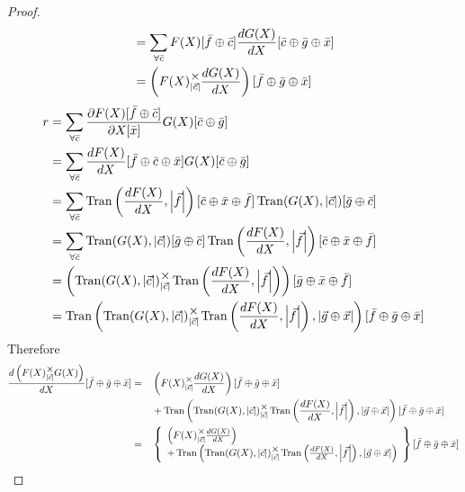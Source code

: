 \documentclass[12pt]{book}
\theoremstyle{plain}
\theoremstyle{definition}
\theoremstyle{ppart}
\theoremstyle{case}
\theoremstyle{solution}
\DeclareMathOperator{\Tran}{Tran}
\newcommand{\mmult}[1]{\text{\raisebox{1ex}{$\underset{#1}{\times}$}}}
\newcommand{\shape}[1]{\left|#1\right|}
\begin{document}
\begin{landscape}
\begin{proof}
\begin{align*}
 &=
  \sum_{\forall \bar{c}}
    F(X)[\bar{f} \oplus \bar{c}]
    \frac{dG(X)}{dX}[\bar{c} \oplus \bar{g} \oplus \bar{x}] \\
 &=
   \left( F(X) \mmult{\shape{\vec{c}}} \frac{dG(X)}{dX} \right)
   [\bar{f} \oplus \bar{g} \oplus \bar{x}]
\end{align*}
\begin{align*}
 r
 &=
  \sum_{\forall \bar{c}}
    \frac{\partial F(X)[\bar{f} \oplus \bar{c}]}{\partial X[\bar{x}]}
    G(X)[\bar{c} \oplus \bar{g}] \\
 &=
  \sum_{\forall \bar{c}}
    \frac{dF(X)}{dX}[\bar{f} \oplus \bar{c} \oplus \bar{x}]
    G(X)[\bar{c} \oplus \bar{g}] \\
 &=
  \sum_{\forall \bar{c}}
    \Tran\left(\frac{dF(X)}{dX}, \shape{\vec{f}}\right)
      [\bar{c} \oplus \bar{x} \oplus \bar{f}]
    \Tran(G(X), \shape{\vec{c}})[\bar{g} \oplus \bar{c}] \\
 &=
  \sum_{\forall \bar{c}}
    \Tran(G(X), \shape{\vec{c}})[\bar{g} \oplus \bar{c}]
    \Tran\left(\frac{dF(X)}{dX}, \shape{\vec{f}}\right)
      [\bar{c} \oplus \bar{x} \oplus \bar{f}] \\
 &=
  \left(
    \Tran(G(X), \shape{\vec{c}}) \mmult{\shape{\vec{c}}}
    \Tran\left(\frac{dF(X)}{dX}, \shape{\vec{f}}\right)
  \right)[\bar{g} \oplus \bar{x} \oplus \bar{f}] \\
 &= 
  \Tran\left(
    \Tran(G(X), \shape{\vec{c}}) \mmult{\shape{\vec{c}}}
    \Tran\left(\frac{dF(X)}{dX}, \shape{\vec{f}}\right)
    , \shape{\vec{g} \oplus \vec{x}}
  \right)[\bar{f} \oplus \bar{g} \oplus \bar{x}]
\end{align*}
Therefore 
\begin{alignat*}{3}
 \frac{d\left(F(X) \mmult{\shape{\vec{c}}} G(X)\right)}{dX}
  [\bar{f} \oplus \bar{g} \oplus \bar{x}]
  &=&&
  \left( F(X) \mmult{\shape{\vec{c}}} \frac{dG(X)}{dX} \right)
  [\bar{f} \oplus \bar{g} \oplus \bar{x}] \\
  &&&+
  \Tran\left(
    \Tran(G(X), \shape{\vec{c}}) \mmult{\shape{\vec{c}}}
    \Tran\left(\frac{dF(X)}{dX}, \shape{\vec{f}}\right)
    , \shape{\vec{g} \oplus \vec{x}}
  \right)[\bar{f} \oplus \bar{g} \oplus \bar{x}] \\
  &=&&
  \left\{
    \begin{array}{l}
      \left( F(X) \mmult{\shape{\vec{c}}} \frac{dG(X)}{dX} \right) \\
      +
      \Tran\left(
        \Tran(G(X), \shape{\vec{c}}) \mmult{\shape{\vec{c}}}
        \Tran\left(\frac{dF(X)}{dX}, \shape{\vec{f}}\right)
        , \shape{\vec{g} \oplus \vec{x}}
      \right)
    \end{array}
  \right\}
  [\bar{f} \oplus \bar{g} \oplus \bar{x}]
\end{alignat*}
\end{proof}
\end{landscape}
\end{document}
